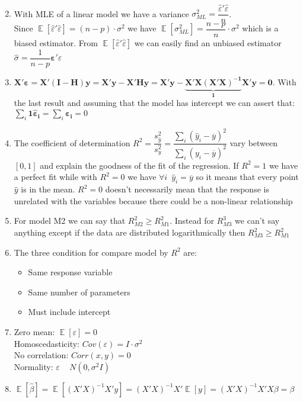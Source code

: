 \documentclass[10pt,a4paper]{article}
\DeclareMathOperator{\E}{\mathbb{E}}
\begin{document}
\begin{enumerate}
\begin{align*}
		\end{align*}
		\item With MLE of a linear model we have a variance $ \sigma^2_{ML} = \dfrac{\hat{\varepsilon}'\hat{\varepsilon}}{n} $.\\
		Since $ \E\left[ \hat{\varepsilon}'\hat{\varepsilon} \right] = (n-p) \cdot \sigma^2$ we have $ \E\left[ \sigma^2_{ML} \right] = \dfrac{n-p}{n} \cdot \sigma^2 $ which is a biased estimator. From $ \E\left[ \hat{\varepsilon}'\hat{\varepsilon} \right]  $ we can easily find an unbiased estimator $ \hat{\sigma} = \dfrac{1}{n-p} \mathbf{\varepsilon}' \varepsilon $
		\item $ \mathbf{X'\varepsilon} = \mathbf{X'(I-H)y}  = \mathbf{X'y - X'Hy} =
		 \mathbf{X'y - \underbrace{\mathbf{X}' \mathbf{X}(\mathbf{X}'\mathbf{X})^{-1}}_1\mathbf{X}' y}  = \mathbf{0} $. With the last result and assuming that the model has intercept we can assert that:
		 $ \sum_i \mathbf{1 \hat{\varepsilon}_i} =   \sum_i \mathbf{\varepsilon_i} = 0 $
		\item The coefficient of determination $ R^2 = \dfrac{s^2_{\hat{y}}}{s^2_y} = \dfrac{\sum_i (\hat{y}_i - \overline{y})^2}{\sum_i (y_i - \overline{y})^2} $ vary between $ \left[0,1\right] $ and explain the goodness of the fit of the regression. If $ R^2=1 $ we have a perfect fit while with $ R^2 = 0 $ we have $ \forall i \,\,\, \hat{y}_i = \overline{y}  $ so it means that every point $ \hat{y} $ is in the mean. $ R^2 = 0 $ doesn't necessarily mean that the response is unrelated with the variables because there could be a non-linear relationship
		\item For model M2 we can say that $ R^2_{M2} \geq R^2_{M1} $. Instead for $ R^3_{M3}  $ we can't say anything except if the data are distributed logarithmically then $ R^2_{M3} \geq R^2_{M1} $
		\item The three condition for compare model by $ R^2 $ are:
		\begin{itemize}
			\item Same response variable
			\item Same number of parameters
			\item Must include intercept
		\end{itemize}
		\item 
		Zero mean:  $ \E\left[\varepsilon \right] = 0 $\\
		Homoscedasticity: $ Cov\left( \varepsilon \right) = I \cdot \sigma^2 $\\
		No correlation: $ Corr(x,y) = 0 $ \\
		Normality: $ \varepsilon  $ ~ $ N(0, \sigma^2 I) $
		\item 
		$ \E \left[ \hat{\beta} \right] = \E \left[ (X'X)^{-1} X'  y \right] = (X'X)^{-1} X' \E \left[y\right] = (X'X)^{-1} X' X \beta = \beta $
	\end{enumerate}
\end{document}
